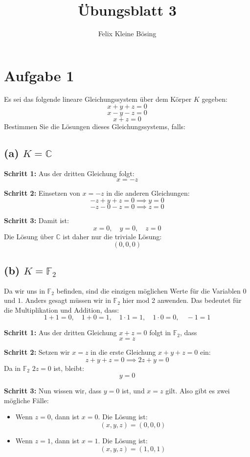 \documentclass[11pt]{article}
\begin{document}
\title{Übungsblatt 3}
\author{Felix Kleine Bösing}
\maketitle

\section*{Aufgabe 1}


Es sei das folgende lineare Gleichungssystem über dem Körper \( K \) gegeben:
\[
x + y + z = 0
\]
\[
x - y - z = 0
\]
\[
x + z = 0
\]
Bestimmen Sie die Lösungen dieses Gleichungssystems, falls:

\subsection*{(a) \( K = \mathbb{C} \)}

\textbf{Schritt 1:} Aus der dritten Gleichung folgt:
\[
x = -z
\]

\textbf{Schritt 2:} Einsetzen von \( x = -z \) in die anderen Gleichungen:
\[
-z + y + z = 0 \implies y = 0
\]
\[
-z - 0 - z = 0 \implies z = 0
\]

\textbf{Schritt 3:} Damit ist:
\[
x = 0, \quad y = 0, \quad z = 0
\]
Die Lösung über \( \mathbb{C} \) ist daher nur die triviale Lösung:
\[
(0, 0, 0)
\]

\subsection*{(b) \( K = \mathbb{F}_2 \)}

Da wir uns in \( \mathbb{F}_2 \) befinden, sind die einzigen möglichen Werte für die Variablen \( 0 \) und \( 1 \).
Anders gesagt müssen wir in \( \mathbb{F}_2 \) hier mod 2 anwenden. Das bedeutet für die Multiplikation und Addition, dass:
\[
    1 + 1 = 0, \quad 1 + 0 = 1, \quad 1 \cdot 1 = 1, \quad 1 \cdot 0 = 0, \quad -1 = 1
\]

\textbf{Schritt 1:} Aus der dritten Gleichung \( x + z = 0 \) folgt in \( \mathbb{F}_2 \), dass
\[
x = z
\]

\textbf{Schritt 2:} Setzen wir \( x = z \) in die erste Gleichung \( x + y + z = 0 \) ein:
\[
z + y + z = 0 \implies 2z + y = 0
\]
Da in \( \mathbb{F}_2 \) \( 2z = 0 \) ist, bleibt:
\[
y = 0
\]

\textbf{Schritt 3:} Nun wissen wir, dass \( y = 0 \) ist, und \( x = z \) gilt. Also gibt es zwei mögliche Fälle:
\begin{itemize}
    \item Wenn \( z = 0 \), dann ist \( x = 0 \). Die Lösung ist:
    \[
    (x, y, z) = (0, 0, 0)
    \]
    \item Wenn \( z = 1 \), dann ist \( x = 1 \). Die Lösung ist:
    \[
    (x, y, z) = (1, 0, 1)
    \]
\end{itemize}
\end{document}
